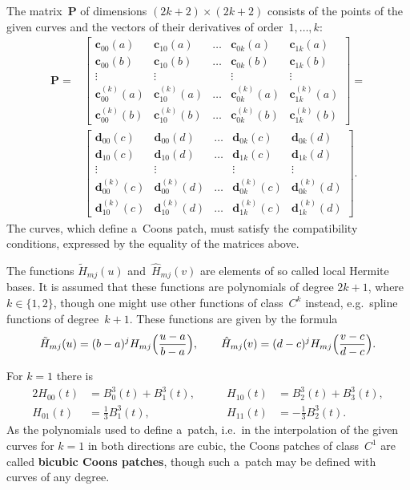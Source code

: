 The matrix~$\bm{P}$ of dimensions $(2k+2)\times(2k+2)$ consists of the points
of the given curves and the vectors of their derivatives of order~$1,\ldots,k$:
\begin{align}\label{eq:Coons:compat:cond}
  \bm{P} ={}& \left[\begin{array}{ccccc}
    \bm{c}_{00}(a) & \bm{c}_{10}(a) & \ldots & \bm{c}_{0k}(a) & \bm{c}_{1k}(a) \\
    \bm{c}_{00}(b) & \bm{c}_{10}(b) & \ldots & \bm{c}_{0k}(b) & \bm{c}_{1k}(b) \\
    \vdots & \vdots & & \vdots & \vdots \\
    \bm{c}^{(k)}_{00}(a) & \bm{c}^{(k)}_{10}(a) & \ldots &
    \bm{c}^{(k)}_{0k}(a) & \bm{c}^{(k)}_{1k}(a) \\
    \bm{c}^{(k)}_{00}(b) & \bm{c}^{(k)}_{10}(b) & \ldots &
    \bm{c}^{(k)}_{0k}(b) & \bm{c}^{(k)}_{1k}(b)
  \end{array}\right] = \nonumber \\
 &\left[\begin{array}{ccccc}
    \bm{d}_{00}(c) & \bm{d}_{00}(d) & \ldots & \bm{d}_{0k}(c) & \bm{d}_{0k}(d) \\
    \bm{d}_{10}(c) & \bm{d}_{10}(d) & \ldots & \bm{d}_{1k}(c) & \bm{d}_{1k}(d) \\
    \vdots & \vdots & & \vdots & \vdots \\
    \bm{d}^{(k)}_{00}(c) & \bm{d}^{(k)}_{00}(d) & \ldots &
    \bm{d}^{(k)}_{0k}(c) & \bm{d}^{(k)}_{0k}(d) \\
    \bm{d}^{(k)}_{10}(c) & \bm{d}^{(k)}_{10}(d) & \ldots &
    \bm{d}^{(k)}_{1k}(c) & \bm{d}^{(k)}_{1k}(d)
  \end{array}\right].
\end{align}
The curves, which define a~Coons patch, must satisfy the compatibility
conditions, expressed by the equality of the matrices above.

The functions $\tilde{H}_{mj}(u)$ and~$\hat{H}_{mj}(v)$ are elements of
so called local Hermite bases.
It is assumed that these functions are polynomials of degree $2k+1$, where
$k\in\{1,2\}$, though one might use other functions of class~$C^k$ instead,
e.g.\ spline functions of degree~$k+1$. These functions are given
by the formula
\begin{align*}
  \tilde{H}_{mj}(u) = (b-a)^jH_{mj}\Bigl(\frac{u-a}{b-a}\Bigr),\qquad
  \hat{H}_{mj}(v) = (d-c)^jH_{mj}\Bigl(\frac{v-c}{d-c}\Bigr).
\end{align*}

For $k=1$ there is
\begin{alignat*}{2}
  H_{00}(t) &{}= B^3_0(t)+B^3_1(t),\qquad &
  H_{10}(t) &{}= B^3_2(t)+B^3_3(t),\\
  H_{01}(t) &{}= \frac{1}{3}B^3_1(t),\qquad &
  H_{11}(t) &{}= -\frac{1}{3}B^3_2(t).
\end{alignat*}
As the polynomials used to define a~patch, i.e.\ in the interpolation
of the given curves for $k=1$ in both directions are cubic, the Coons
patches of class~$C^1$ are called \textbf{bicubic Coons patches},
though such a~patch may be defined with curves of any degree.

